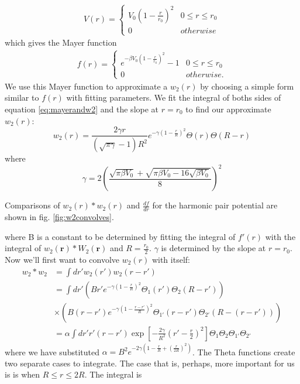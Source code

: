 \documentclass[letterpaper,twocolumn,amsmath,amssymb,prb]{revtex4-1}
\newcommand{\rr}{\textbf{r}}
\begin{document}
\begin{align}
  V(r) =
  \begin{cases}
    V_0 \left ( 1 - \frac{r}{r_0} \right )^2 & 0 \leq r \leq r_0\\
    0 & otherwise
  \end{cases}
\end{align}
which gives the Mayer function 
\begin{align}\label{eq:harmonicmayer}
  f(r) =
  \begin{cases}
    e^{-\beta V_0 \left( 1 - \frac{r}{r_0} \right)^2} - 1 & 0 \leq r
    \leq r_0 \\
    0 & otherwise.
  \end{cases} 
\end{align}
We use this Mayer function to approximate a $w_2(r)$ by choosing a
simple form similar to $f(r)$ with fitting parameters. We fit the
integral of boths sides of equation \ref{eq:mayerandw2} and the
slope at $r=r_0$ to find our approximate $w_2(r)$: 
\begin{equation}
  w_2(r) = \frac{2\gamma r}{(\sqrt{\pi \gamma} - 1)R^2} e^{-\gamma
    \left ( 1 - \frac{r}{R} \right )^2}\Theta(r) \Theta (R - r)
\end{equation}
where
\begin{equation}
  \gamma = 2 \left(\frac{\sqrt{\pi \beta V_0} + \sqrt{\pi \beta V_0 -
    16\sqrt{\beta V_0}}}{8}\right)^2
\end{equation}

Comparisons of $w_2(r)\ast w_2(r)$ and $\frac{df}{dr}$ for the harmonic
pair potential are shown in fig. \ref{fig:w2convolves}.

where B is a constant to be determined by fitting the integral of
$f'(r)$ with the integral of $w_2(\rr)\ast W_2(\rr)$ and $R =
\frac{r_0}{2}$.  $\gamma$ is determined by the slope at $r = r_0$.  
Now we'll first want to convolve $w_2(r)$ with
itself:
\begin{align*}
  w_2 \ast w_2 &= \int dr' w_2 (r')w_2(r - r') \\ 
     &= \int dr' \left(B r' e^{- \gamma \left (1 - \frac{r}{R} \right )^2}
                              \Theta_1 (r') \Theta_2 (R - r') \right) \\
     &\times \left( B (r-r') e^{- \gamma \left(1 - \frac{r-r'}{R}
                                \right)^2}\Theta_{1'} (r-r') \Theta_{2'} (R -
                                (r-r')) \right) \\
     &= \alpha \int dr' r'(r-r') \exp \left [-\frac{2\gamma}{R^2} \left (r' -
                              \frac{r}{2} \right)^2 \right ] \Theta_1
                              \Theta_2 \Theta_{1'} \Theta_{2'}
\end{align*}
where we have substituted $\alpha = B^2 e^{- 2 \gamma \left(1 -
  \frac{r}{R} + (\frac{r}{2R})^2 \right )}$. The Theta functions create two separate
cases to integrate.  The case that is, perhaps, more important for us
is is when $R \leq r \leq 2R$.  The integral is
\end{document}
